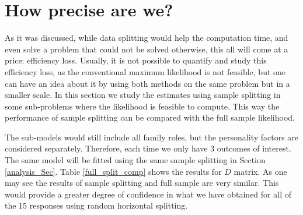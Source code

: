 \documentclass[11pt,a5paper,twoside]{book}
\begin{document}
\section{How precise are we?}
\label{how_good_sec}

As it was discussed, while data splitting would help the computation time, and even solve a problem that could not be solved otherwise, this all will come at a price: efficiency loss. Usually, it is not possible to quantify and study this efficiency loss, as the conventional maximum likelihood is not feasible, but one can have an idea about it by using both methods on the same problem but in a smaller scale. In this section we study the estimates using sample splitting in some sub-problems where the likelihood is feasible to compute. This way the performance of sample splitting can be compared with the full sample likelihood. 

The sub-models would still include all family roles, but the personality factors are considered separately. Therefore, each time we only have 3 outcomes of interest. The same model will be fitted using the same sample splitting in Section \ref{analysis_Sec}. Table \ref{full_split_comp} shows the results for $D$ matrix. As one may see the results of sample splitting and full sample are very similar. This would provide a greater degree of confidence in what we have obtained for all of the 15 responses using random horizontal splitting.
\end{document}
